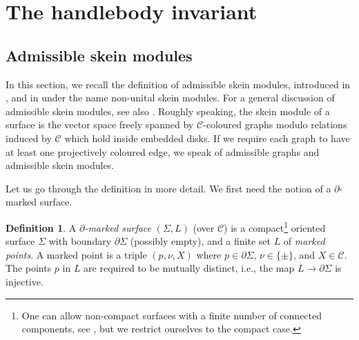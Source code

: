 \documentclass[11pt]{amsart}
\theoremstyle{definition}
\newtheorem{definition}[thm]{Definition}
\numberwithin{equation}{section}
\def\bd{{\partial}}
\def\cC{\mathcal{C}}
\def\to{\rightarrow}
\begin{document}
\section{The handlebody invariant}

\subsection{Admissible skein modules}\label{sec:sk-mod}

In this section, we recall the definition of admissible skein modules, introduced in \cite{CGPV23}, and in \cite{Reutter:2020} under the name non-unital skein modules. For a general discussion of admissible skein modules, see also \cite{RST24}. Roughly speaking, the skein module of a surface is the vector space freely spanned by $\cC$-coloured graphs modulo relations induced by $\cC$ which hold inside embedded disks. If we require each graph to have at least one projectively coloured edge, we speak of admissible graphs and admissible skein modules.

\medskip

Let us go through the definition in more detail. We first need the notion of a $\partial$-marked surface.

\begin{definition}\label{def:d-marked-surface}
A \emph{$\bd$-marked surface} $(\Sigma,L)$ (over $\cC$) is a compact\footnote{
One can allow non-compact surfaces with a finite number of connected components, see \cite{RST24}, but we restrict ourselves to the compact case.}
oriented surface $\Sigma$ with boundary $\bd\Sigma$ (possibly empty), and a finite set $L$ of \textit{marked points}. A marked point is a triple $(p,\nu,X)$ where $p \in \bd\Sigma$, $\nu \in \{ \pm \}$, and $X \in \cC$. The points $p$ in $L$ are required to be mutually distinct, i.e., the map $L \to \bd\Sigma$ is injective.
\end{definition}
\end{document}
